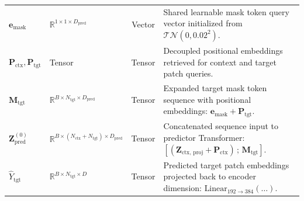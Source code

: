 \documentclass{article}
\begin{document}
\begin{table}[ht]
{\begin{tabular}{llcp{8.6cm}}
$\mathbf{e}_{\text{mask}}$ & $\mathbb{R}^{1 \times 1 \times D_{\text{pred}}}$ & Vector & Shared learnable mask token query vector initialized from $\mathcal{TN}(0, 0.02^2)$. \\
$\mathbf{P}_{\text{ctx}}, \mathbf{P}_{\text{tgt}}$ & Tensor & Tensor & Decoupled positional embeddings retrieved for context and target patch queries. \\
$\mathbf{M}_{\text{tgt}}$ & $\mathbb{R}^{B \times N_{\text{tgt}} \times D_{\text{pred}}}$ & Tensor & Expanded target mask token sequence with positional embeddings: $\mathbf{e}_{\text{mask}} + \mathbf{P}_{\text{tgt}}$. \\
$\mathbf{Z}_{\text{pred}}^{(0)}$ & $\mathbb{R}^{B \times (N_{\text{ctx}} + N_{\text{tgt}}) \times D_{\text{pred}}}$ & Tensor & Concatenated sequence input to predictor Transformer: $[ (\mathbf{Z}_{\text{ctx, proj}} + \mathbf{P}_{\text{ctx}}) \,;\, \mathbf{M}_{\text{tgt}} ]$. \\
$\hat{Y}_{\text{tgt}}$ & $\mathbb{R}^{B \times N_{\text{tgt}} \times D}$ & Tensor & Predicted target patch embeddings projected back to encoder dimension: $\text{Linear}_{192 \to 384}(\dots)$. \\
\bottomrule
\end{tabular}%
}
\end{table}
\end{document}
